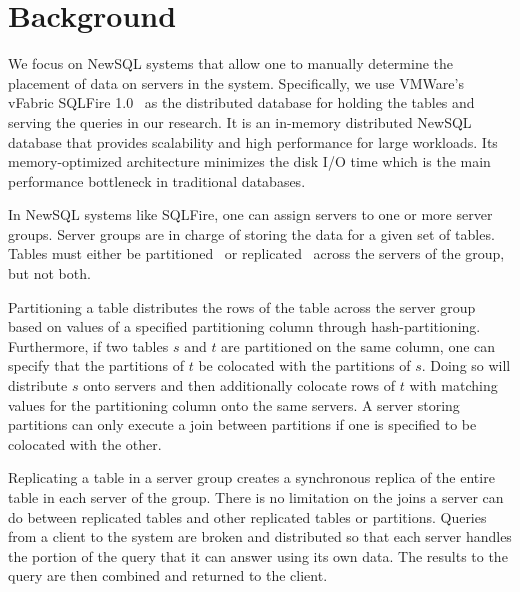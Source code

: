 \section{Background}
\label{sec:background}
We focus on NewSQL systems that allow one to manually determine the placement of data on servers in the system.  Specifically, we use VMWare's vFabric SQLFire 1.0~\cite{web:sqlfire} as the distributed database for holding the tables and serving the queries in our research. It is an in-memory distributed NewSQL database that provides scalability and high performance for large workloads. Its memory-optimized architecture minimizes the disk I/O time which is the main performance bottleneck in traditional databases.

In NewSQL systems like SQLFire, one can assign servers to one or more server groups.  Server groups are in charge of storing the data for a given set of tables.  Tables must either be partitioned~\cite{web:paritioning} or replicated~\cite{web:replication} across the servers of the group, but not both.

Partitioning a table distributes the rows of the table across the server group based on values of a specified partitioning column through hash-partitioning.  Furthermore, if two tables $s$ and $t$ are partitioned on the same column, one can specify that the partitions of $t$ be colocated with the partitions of $s$.  Doing so will distribute $s$ onto servers and then additionally colocate rows of $t$ with matching values for the partitioning column onto the same servers.  A server storing partitions can only execute a join between partitions if one is specified to be colocated with the other.

Replicating a table in a server group creates a synchronous replica of the entire table in each server of the group.  There is no limitation on the joins a server can do between replicated tables and other replicated tables or partitions.  Queries from a client to the system are broken and distributed so that each server handles the portion of the query that it can answer using its own data.  The results to the query are then combined and returned to the client.